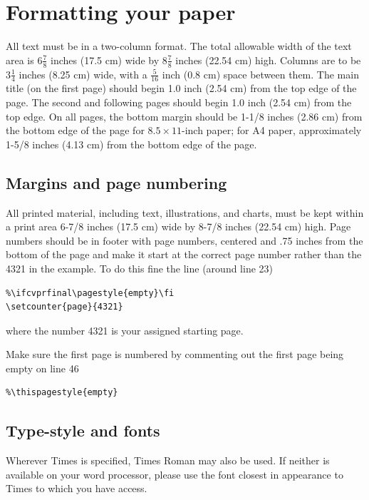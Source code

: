\documentclass[10pt,twocolumn,letterpaper]{article}
\begin{document}
\section{Formatting your paper}

All text must be in a two-column format. The total allowable width of the
text area is $6\frac78$ inches (17.5 cm) wide by $8\frac78$ inches (22.54
cm) high. Columns are to be $3\frac14$ inches (8.25 cm) wide, with a
$\frac{5}{16}$ inch (0.8 cm) space between them. The main title (on the
first page) should begin 1.0 inch (2.54 cm) from the top edge of the
page. The second and following pages should begin 1.0 inch (2.54 cm) from
the top edge. On all pages, the bottom margin should be 1-1/8 inches (2.86
cm) from the bottom edge of the page for $8.5 \times 11$-inch paper; for A4
paper, approximately 1-5/8 inches (4.13 cm) from the bottom edge of the
page.

\subsection{Margins and page numbering}

All printed material, including text, illustrations, and charts, must be kept
within a print area 6-7/8 inches (17.5 cm) wide by 8-7/8 inches (22.54 cm)
high.
Page numbers should be in footer with page numbers, centered and .75
inches from the bottom of the page and make it start at the correct page
number rather than the 4321 in the example.  To do this fine the line (around
line 23)
\begin{verbatim}
%\ifcvprfinal\pagestyle{empty}\fi
\setcounter{page}{4321}
\end{verbatim}
where the number 4321 is your assigned starting page.

Make sure the first page is numbered by commenting out the first page being
empty on line 46
\begin{verbatim}
%\thispagestyle{empty}
\end{verbatim}


\subsection{Type-style and fonts}

Wherever Times is specified, Times Roman may also be used. If neither is
available on your word processor, please use the font closest in
appearance to Times to which you have access.
\end{document}
